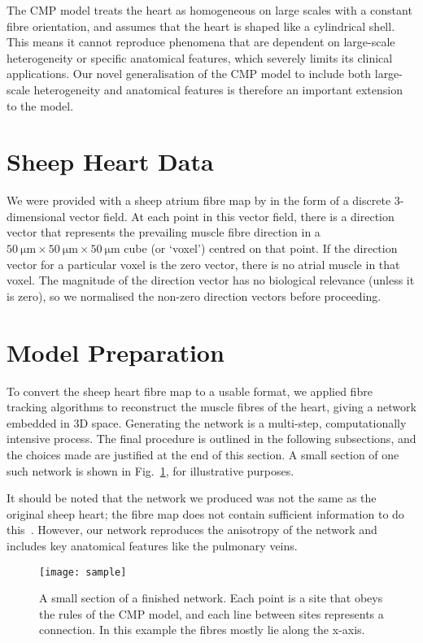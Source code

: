 The CMP model treats the heart as homogeneous on large scales with a constant fibre orientation, and assumes that the heart is shaped like a cylindrical shell. This means it cannot reproduce phenomena that are dependent on large-scale heterogeneity or specific anatomical features, which severely limits its clinical applications. Our novel generalisation of the CMP model to include both large-scale heterogeneity and anatomical features is therefore an important extension to the model.


\section{Sheep Heart Data}

We were provided with a sheep atrium fibre map by 
in the form of a discrete 3-dimensional vector field. At each point in this vector field, there is a direction vector that represents the prevailing muscle fibre direction in a $50~\mathrm{\mu m} \times 50~\mathrm{\mu m} \times 50~\mathrm{\mu m}$ cube (or `voxel') centred on that point. If the direction vector for a particular voxel is the zero vector, there is no atrial muscle in that voxel. The magnitude of the direction vector has no biological relevance (unless it is zero), so we normalised the non-zero direction vectors before proceeding.


\section{Model Preparation}

To convert the sheep heart fibre map to a usable format, we applied fibre tracking algorithms to reconstruct the muscle fibres of the heart, giving a network embedded in 3D space.
Generating the network is a multi-step, computationally intensive process. The final procedure is outlined in the following subsections, and the choices made are justified at the end of this section. A small section of one such network is shown in Fig.~\ref{fig:sample}, for illustrative purposes.

It should be noted that the network we produced was not the same as the original sheep heart; the fibre map does not contain sufficient information to do this~\cite{jiang2006dtistudio}. However, our network reproduces the anisotropy of the network and includes key anatomical features like the pulmonary veins.

\begin{figure} \begin{mdframed}
    \centering
    \texttt{[image: sample]}
    \caption{A small section of a finished network. Each point is a site that obeys the rules of the CMP model, and each line between sites represents a connection. In this example the fibres mostly lie along the x-axis.}
    \label{fig:sample}
\end{mdframed} \end{figure}

